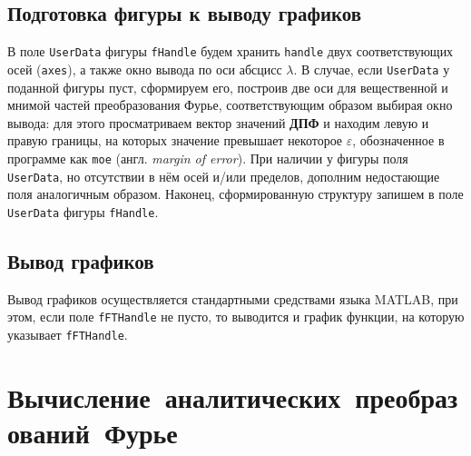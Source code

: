 \documentclass[11pt, oneside, final]{article}
\numberwithin{equation}{section}
\begin{document}
    \subsection{Подготовка фигуры к выводу графиков} %
    \label{sub:prepare_graphs}
    В поле \texttt{UserData} фигуры \texttt{fHandle} будем хранить \texttt{handle} двух соответствующих осей (\texttt{axes}),
    а также окно вывода по оси абсцисс \(\lambda\). В случае, если \texttt{UserData} у поданной фигуры пуст, сформируем его, построив две оси для вещественной и мнимой частей
    преобразования Фурье, соответствующим образом выбирая окно вывода: для этого просматриваем вектор значений \textbf{ДПФ} и находим левую и правую границы, на которых значение
    превышает некоторое \(\varepsilon\), обозначенное в программе как \texttt{moe} (англ. \emph{margin of error}). 
    При наличии у фигуры поля \texttt{UserData}, но отсутствии в нём осей и/или пределов, дополним недостающие поля аналогичным образом.
    Наконец, сформированную структуру запишем в поле \texttt{UserData} фигуры \texttt{fHandle}.
    \subsection{Вывод графиков} %
    \label{sub:plotting}
    Вывод графиков осуществляется стандартными средствами языка MATLAB, при этом, если поле \texttt{fFTHandle} не пусто, то выводится и график функции, на которую
    указывает \texttt{fFTHandle}.
    \clearpage
    \section{Вычисление~аналитических~преобразований~Фурье}
\end{document}
